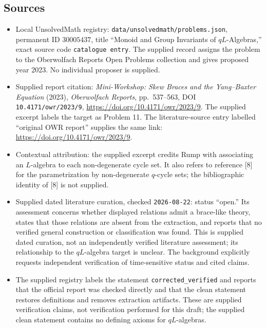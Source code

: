 \documentclass[11pt]{article}
\begin{document}
\subsection{Sources}
\begin{itemize}
\item Local UnsolvedMath registry: \texttt{data/unsolvedmath/problems.json}, permanent ID \(30005437\), title ``Monoid and Group Invariants of \(qL\)-Algebras,'' exact source code \texttt{catalogue entry}. The supplied record assigns the problem to the Oberwolfach Reports Open Problems collection and gives proposed year 2023. No individual proposer is supplied.
\item Supplied report citation: \emph{Mini-Workshop: Skew Braces and the Yang--Baxter Equation} (2023), \emph{Oberwolfach Reports}, pp.\ 537--563, DOI \texttt{10.4171/owr/2023/9}, \url{https://doi.org/10.4171/owr/2023/9}. The supplied excerpt labels the target as Problem 11. The literature-source entry labelled ``original OWR report'' supplies the same link: \url{https://doi.org/10.4171/owr/2023/9}.
\item Contextual attribution: the supplied excerpt credits Rump with associating an \(L\)-algebra to each non-degenerate cycle set. It also refers to reference [8] for the parametrization by non-degenerate \(q\)-cycle sets; the bibliographic identity of [8] is not supplied.
\item Supplied dated literature curation, checked \texttt{2026-08-22}: status ``open.'' Its assessment concerns whether displayed relations admit a brace-like theory, states that those relations are absent from the extraction, and reports that no verified general construction or classification was found. This is supplied dated curation, not an independently verified literature assessment; its relationship to the \(qL\)-algebra target is unclear. The background explicitly requests independent verification of time-sensitive status and cited claims.
\item The supplied registry labels the statement \texttt{corrected\_verified} and reports that the official report was checked directly and that the clean statement restores definitions and removes extraction artifacts. These are supplied verification claims, not verification performed for this draft; the supplied clean statement contains no defining axioms for \(qL\)-algebras.
\end{itemize}
\end{document}
